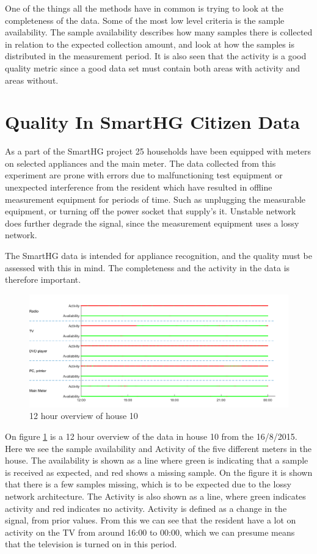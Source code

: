 One of the things all the methods have in common is trying to look at the completeness of the data. Some of the most low level criteria is the sample availability. The sample availability describes how many samples there is collected in relation to the expected collection amount, and look at how the samples is distributed in the measurement period. It is also seen that the activity is a good quality metric since a good data set must contain both areas with activity and areas without. 

\section{Quality In SmartHG Citizen Data}
As a part of the SmartHG project 25 households have been equipped with meters on selected appliances and the main meter. The data collected from this experiment are prone with errors due to malfunctioning test equipment or unexpected interference from the resident which have resulted in offline measurement equipment for periods of time. Such as unplugging the measurable equipment, or turning off the power socket that supply's it. Unstable network does further degrade the signal, since the measurement equipment uses a lossy network. 

The SmartHG data is intended for appliance recognition, and the quality must be assessed with this in mind. The completeness and the activity in the data is therefore important. 

\begin{figure}[H]
\centering
\includegraphics[width=1\textwidth]{billeder/Test.png}
\caption{12 hour overview of house 10}
\label{fig:12HRes}
\end{figure}

On figure \ref{fig:12HRes} is a 12 hour overview of the data in house 10 from the 16/8/2015. Here we see the sample availability and Activity of the five different meters in the house. The availability is shown as a line where green is indicating that a sample is received as expected, and red shows a missing sample. On the figure it is shown that there is a few samples missing, which is to be expected due to the lossy network architecture. The Activity is also shown as a line, where green indicates activity and red indicates no activity. Activity is defined as a change in the signal, from prior values. From this we can see that the resident have a lot on activity on the TV from around 16:00 to 00:00, which we can presume means that the television is turned on in this period. 

